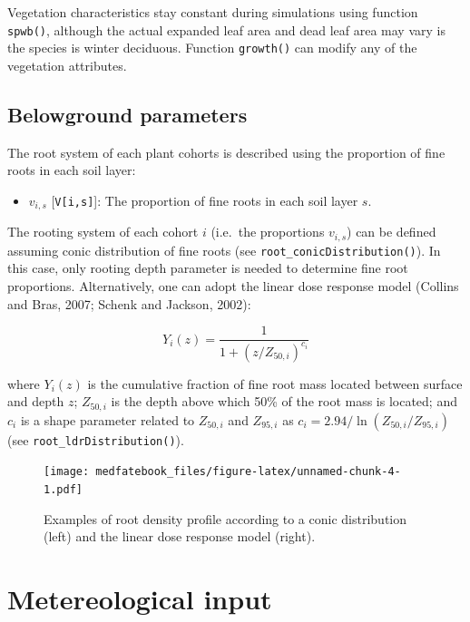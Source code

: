 \documentclass[]{book}
\providecommand{\tightlist}{%
  \setlength{\itemsep}{0pt}\setlength{\parskip}{0pt}}
\begin{document}
Vegetation characteristics stay constant during simulations using
function \texttt{spwb()}, although the actual expanded leaf area and
dead leaf area may vary is the species is winter deciduous. Function
\texttt{growth()} can modify any of the vegetation attributes.

\subsection{Belowground parameters}\label{belowground-parameters}

The root system of each plant cohorts is described using the proportion
of fine roots in each soil layer:

\begin{itemize}
\tightlist
\item
  \(v_{i,s}\) {[}\texttt{V{[}i,s{]}}{]}: The proportion of fine roots in
  each soil layer \(s\).
\end{itemize}

The rooting system of each cohort \(i\) (i.e.~the proportions
\(v_{i,s}\)) can be defined assuming conic distribution of fine roots
(see \texttt{root\_conicDistribution()}). In this case, only rooting
depth parameter is needed to determine fine root proportions.
Alternatively, one can adopt the linear dose response model (Collins and
Bras, 2007; Schenk and Jackson, 2002):

\begin{equation}
Y_i(z)=\frac{1}{1+(z/Z_{50,i})^{c_i}}
\end{equation}

where \(Y_i(z)\) is the cumulative fraction of fine root mass located
between surface and depth \(z\); \(Z_{50,i}\) is the depth above which
50\% of the root mass is located; and \(c_i\) is a shape parameter
related to \(Z_{50,i}\) and \(Z_{95,i}\) as
\(c_i = 2.94 / \ln(Z_{50,i} / Z_{95,i})\) (see
\texttt{root\_ldrDistribution()}).

\begin{figure}
\centering
\texttt{[image: medfatebook\_files/figure-latex/unnamed-chunk-4-1.pdf]}
\caption{\label{fig:unnamed-chunk-4}Examples of root density profile
according to a conic distribution (left) and the linear dose response
model (right).}
\end{figure}

\section{Metereological input}\label{meteoinput}
\end{document}
